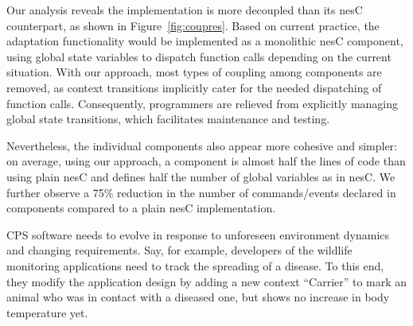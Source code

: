  Our analysis reveals the \conesc
implementation is more decoupled than its nesC counterpart, as
shown in Figure~\ref{fig:coupres}. Based on current practice, the
adaptation functionality would be implemented as a monolithic nesC
component, using global state variables to dispatch function calls
depending on the current situation. With our approach, most types of
coupling among components are removed, as context transitions
implicitly cater for the needed dispatching of function
calls. Consequently, programmers are relieved from explicitly managing
global state transitions, which facilitates maintenance and testing.

Nevertheless, the individual \conesc components also appear more
cohesive and simpler: on average, using our approach, a component is
almost half the lines of code than using plain nesC and defines half
the number of global variables as in nesC. We further observe a 75\%
reduction in the number of commands/events declared in \conesc
components compared to a plain nesC implementation.



 CPS software needs to
evolve in response to unforeseen environment dynamics and changing
requirements. Say, for example, developers of the wildlife monitoring
applications need to track the spreading of a disease. To this
end, they modify the application design by adding a new context
``Carrier'' to mark an animal who was in contact with a diseased one,
but shows no increase in body temperature yet. 

